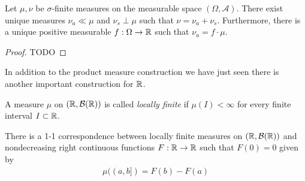 \begin{thm}\label{RadonNikodym}Let $\mu, \nu$
  be $\sigma$-finite measures on the measurable space $(\Omega,
  \mathcal{A})$.  There exist unique measures $\nu_a \ll \mu$ and
  $\nu_s \perp \mu$ such that $\nu = \nu_a + \nu_s$.  Furthermore,
  there is a unique positive measurable $f : \Omega \to \mathbb{R}$ such
  that $\nu_a = f \cdot \mu$.
\end{thm}
\begin{proof}TODO
\end{proof}

In addition to the product measure construction we have just seen
there is another important construction for $\mathbb{R}$.
\begin{defn}A measure $\mu$ on $(\mathbb{R}, \mathcal{B}(\mathbb{R}))$ is called
  \emph{locally finite} if $\mu(I) < \infty$ for every finite interval
  $I \subset \mathbb{R}$.
\end{defn}
\begin{lem}\label{LebesgueStieltjesMeasure}There is a 1-1
  correspondence between locally finite measures on $(\mathbb{R},\mathcal{B}(\mathbb{R}))$ and
  nondecreasing right continuous functions $F : \mathbb{R} \to \mathbb{R}$ such that $F(0)=0$ given by 
\begin{align*}
\mu((a,b]) = F(b) - F(a)
\end{align*}
\end{lem}
